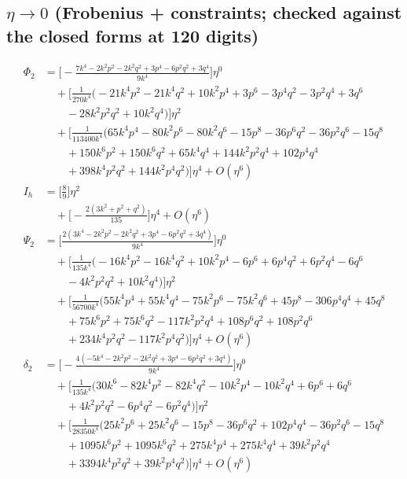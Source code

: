 \documentclass[10pt]{article}
\begin{document}
\subsection*{$\eta\to0$ (Frobenius + constraints; checked against the closed forms at 120 digits)}
\begin{align}
\Phi_2&=\Big[- \frac{7 k^{4} - 2 k^{2} p^{2} - 2 k^{2} q^{2} + 3 p^{4} - 6 p^{2} q^{2} + 3 q^{4}}{9 k^{4}}\Big]\eta^{0} \\ &\quad + \Big[\frac{1}{270 k^{4}}\Big(- 21 k^{4} p^{2} - 21 k^{4} q^{2} + 10 k^{2} p^{4} + 3 p^{6} - 3 p^{4} q^{2} - 3 p^{2} q^{4} + 3 q^{6} \\ &\qquad - 28 k^{2} p^{2} q^{2} + 10 k^{2} q^{4}\Big)\Big]\eta^{2} \\ &\quad + \Big[\frac{1}{113400 k^{4}}\Big(65 k^{4} p^{4} - 80 k^{2} p^{6} - 80 k^{2} q^{6} - 15 p^{8} - 36 p^{6} q^{2} - 36 p^{2} q^{6} - 15 q^{8} \\ &\qquad +150 k^{6} p^{2} + 150 k^{6} q^{2} + 65 k^{4} q^{4} + 144 k^{2} p^{2} q^{4} + 102 p^{4} q^{4} \\ &\qquad +398 k^{4} p^{2} q^{2} + 144 k^{2} p^{4} q^{2}\Big)\Big]\eta^{4} + O(\eta^{6})\\
I_h&=\Big[\frac{8}{9}\Big]\eta^{2} \\ &\quad + \Big[- \frac{2 \left(3 k^{2} + p^{2} + q^{2}\right)}{135}\Big]\eta^{4} + O(\eta^{6})\\
\Psi_2&=\Big[\frac{2 \left(3 k^{4} - 2 k^{2} p^{2} - 2 k^{2} q^{2} + 3 p^{4} - 6 p^{2} q^{2} + 3 q^{4}\right)}{9 k^{4}}\Big]\eta^{0} \\ &\quad + \Big[\frac{1}{135 k^{4}}\Big(- 16 k^{4} p^{2} - 16 k^{4} q^{2} + 10 k^{2} p^{4} - 6 p^{6} + 6 p^{4} q^{2} + 6 p^{2} q^{4} - 6 q^{6} \\ &\qquad - 4 k^{2} p^{2} q^{2} + 10 k^{2} q^{4}\Big)\Big]\eta^{2} \\ &\quad + \Big[\frac{1}{56700 k^{4}}\Big(55 k^{4} p^{4} + 55 k^{4} q^{4} - 75 k^{2} p^{6} - 75 k^{2} q^{6} + 45 p^{8} - 306 p^{4} q^{4} + 45 q^{8} \\ &\qquad +75 k^{6} p^{2} + 75 k^{6} q^{2} - 117 k^{2} p^{2} q^{4} + 108 p^{6} q^{2} + 108 p^{2} q^{6} \\ &\qquad +234 k^{4} p^{2} q^{2} - 117 k^{2} p^{4} q^{2}\Big)\Big]\eta^{4} + O(\eta^{6})\\
\delta_2&=\Big[- \frac{4 \left(- 5 k^{4} - 2 k^{2} p^{2} - 2 k^{2} q^{2} + 3 p^{4} - 6 p^{2} q^{2} + 3 q^{4}\right)}{9 k^{4}}\Big]\eta^{0} \\ &\quad + \Big[\frac{1}{135 k^{4}}\Big(30 k^{6} - 82 k^{4} p^{2} - 82 k^{4} q^{2} - 10 k^{2} p^{4} - 10 k^{2} q^{4} + 6 p^{6} + 6 q^{6} \\ &\qquad +4 k^{2} p^{2} q^{2} - 6 p^{4} q^{2} - 6 p^{2} q^{4}\Big)\Big]\eta^{2} \\ &\quad + \Big[\frac{1}{28350 k^{4}}\Big(25 k^{2} p^{6} + 25 k^{2} q^{6} - 15 p^{8} - 36 p^{6} q^{2} + 102 p^{4} q^{4} - 36 p^{2} q^{6} - 15 q^{8} \\ &\qquad +1095 k^{6} p^{2} + 1095 k^{6} q^{2} + 275 k^{4} p^{4} + 275 k^{4} q^{4} + 39 k^{2} p^{2} q^{4} \\ &\qquad +3394 k^{4} p^{2} q^{2} + 39 k^{2} p^{4} q^{2}\Big)\Big]\eta^{4} + O(\eta^{6})\\

\end{align}
\end{document}
